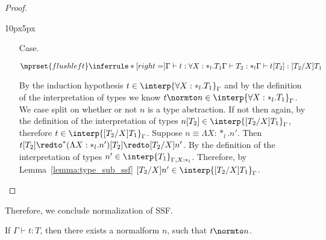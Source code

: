 \begin{proof}
\begin{changemargin}{10px}{5px}
\begin{itemize}
\item[Case.]\ \\
  \begin{center}
    \begin{math}
      $$\mprset{flushleft}
      \inferrule* [right=] {
        \Gamma \vdash t:\forall X:*_l.T_1
        \\
        \Gamma \vdash T_2:*_l
      }{\Gamma \vdash t[T_2]: [T_2/X]T_1}
    \end{math}
  \end{center}
  By the induction hypothesis $t \in \interp{\forall X:*_l.T_1}_\Gamma$ and by the 
  definition of the interpretation of types we know 
  $t \normto n \in \interp{\forall X:*_l.T_1}_\Gamma$.  We case
  split on whether or not $n$ is a type abstraction. If not then again, by the 
  definition of the interpretation of types 
  $n[T_2] \in \interp{[T_2/X]T_1}_\Gamma$, therefore 
  $t \in \interp{[T_2/X]T_1}_\Gamma$.  Suppose $n \equiv \Lambda X:*_l.n'$.  Then 
  $t[T_2] \redto^* (\Lambda X:*_l.n')[T_2] \redto [T_2/X]n'$.  By the definition 
  of the interpretation of types $n' \in \interp{T_1}_{\Gamma,X:*_l}$. Therefore, by
  Lemma~\ref{lemma:type_sub_ssf} $[T_2/X]n' \in \interp{[T_2/X]T_1}_{\Gamma}$.
\end{itemize}
\end{changemargin}
\end{proof}
\noindent Therefore, we conclude normalization of SSF.
\begin{corollary}[Normalization]
  If $\Gamma \vdash t:T$, then there exists a normalform $n$, such
  that $t \normto n$.
\end{corollary}

